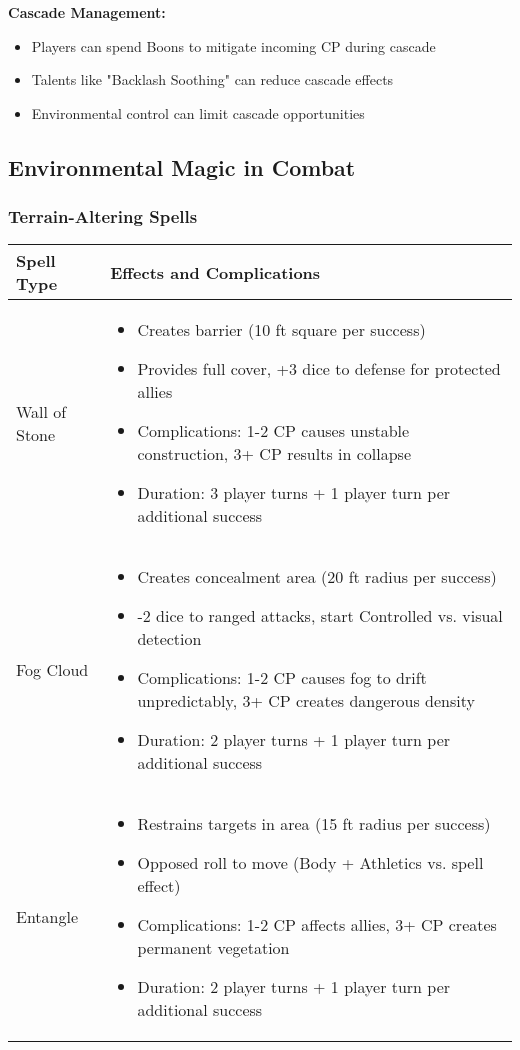 \textbf{Cascade Management:}
\begin{itemize}[leftmargin=*]
    \item Players can spend Boons to mitigate incoming CP during cascade
    \item Talents like "Backlash Soothing" can reduce cascade effects
    \item Environmental control can limit cascade opportunities
\end{itemize}

\subsection{Environmental Magic in Combat}

\subsubsection{Terrain-Altering Spells}
\begin{longtable}{|>{\raggedright\arraybackslash}p{4cm}|>{\raggedright\arraybackslash}p{8cm}|}
\hline
\textbf{Spell Type} & \textbf{Effects and Complications} \\
\hline
Wall of Stone & 
\begin{itemize}
    \item Creates barrier (10 ft square per success)
    \item Provides full cover, +3 dice to defense for protected allies
    \item Complications: 1-2 CP causes unstable construction, 3+ CP results in collapse
    \item Duration: 3 player turns + 1 player turn per additional success
\end{itemize} \\
\hline
Fog Cloud & 
\begin{itemize}
    \item Creates concealment area (20 ft radius per success)
    \item -2 dice to ranged attacks, start Controlled vs. visual detection
    \item Complications: 1-2 CP causes fog to drift unpredictably, 3+ CP creates dangerous density
    \item Duration: 2 player turns + 1 player turn per additional success
\end{itemize} \\
\hline
Entangle & 
\begin{itemize}
    \item Restrains targets in area (15 ft radius per success)
    \item Opposed roll to move (Body + Athletics vs. spell effect)
    \item Complications: 1-2 CP affects allies, 3+ CP creates permanent vegetation
    \item Duration: 2 player turns + 1 player turn per additional success
\end{itemize} \\
\hline
\end{longtable}


